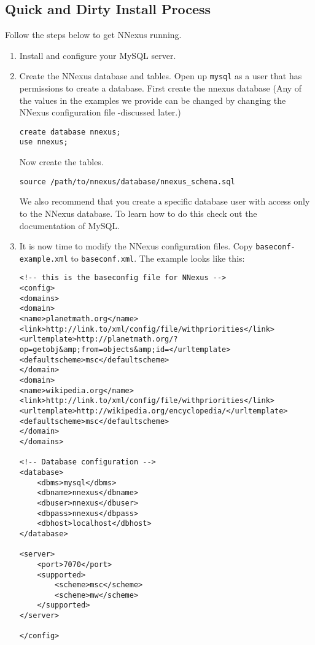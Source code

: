 \documentclass[10pt]{article}
\begin{document}
\subsection{Quick and Dirty Install Process}
Follow the steps below to get NNexus running.
\begin{enumerate}
\item Install and configure your MySQL server.
\item Create the NNexus database and tables.
Open up \texttt{mysql} as a user that has permissions to create a database. First create the nnexus database (Any of the values in the examples we provide can be changed by changing the NNexus configuration file -discussed later.)
\begin{verbatim}
create database nnexus;
use nnexus;
\end{verbatim}
Now create the tables.
\begin{verbatim}
source /path/to/nnexus/database/nnexus_schema.sql
\end{verbatim}

We also recommend that you create a specific database user with access only to the NNexus database.
To learn how to do this check out the documentation of MySQL.

\item It is now time to modify the NNexus configuration files. Copy 
\texttt{baseconf-example.xml} to \texttt{baseconf.xml}.
The example looks like this:
\begin{verbatim}
<!-- this is the baseconfig file for NNexus -->
<config>
<domains>
<domain>
<name>planetmath.org</name>
<link>http://link.to/xml/config/file/withpriorities</link>
<urltemplate>http://planetmath.org/?op=getobj&amp;from=objects&amp;id=</urltemplate>
<defaultscheme>msc</defaultscheme>
</domain>
<domain>
<name>wikipedia.org</name>
<link>http://link.to/xml/config/file/withpriorities</link>
<urltemplate>http://wikipedia.org/encyclopedia/</urltemplate>
<defaultscheme>msc</defaultscheme>
</domain>
</domains>

<!-- Database configuration -->
<database>
	<dbms>mysql</dbms>
	<dbname>nnexus</dbname>
	<dbuser>nnexus</dbuser>
	<dbpass>nnexus</dbpass>
	<dbhost>localhost</dbhost>
</database>

<server>
	<port>7070</port>
	<supported>
		<scheme>msc</scheme>
		<scheme>mw</scheme>
	</supported>
</server>

</config>


\end{verbatim}


\end{enumerate}
\end{document}
